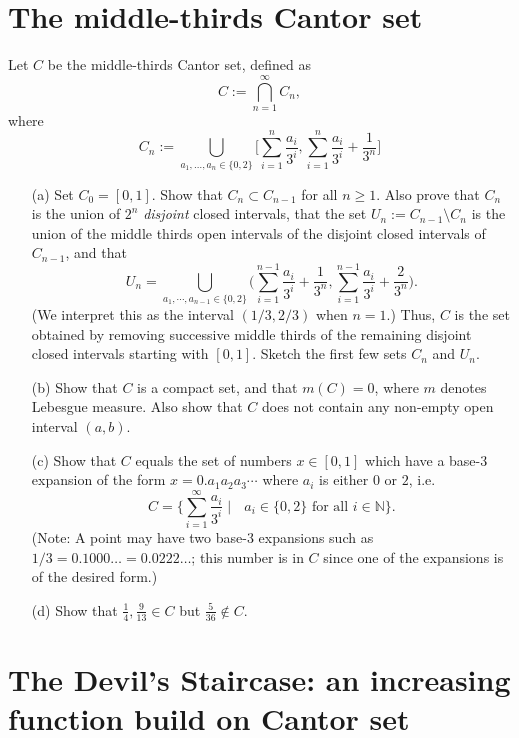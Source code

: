 \documentclass[lang=cn,11pt]{elegantbook}
\begin{document}
\section{The middle-thirds Cantor set}
  Let $C$ be the middle-thirds Cantor set, defined as
  \[
    C:=\bigcap_{n=1}^\infty C_n,
  \]
 where
\[
  C_n:=\bigcup_{a_1, \dots, a_n\in \{0,2\}} \big[\sum_{i=1}^n \frac{a_i}{3^i}, \sum_{i=1}^{n} \frac{a_i}{3^i} +\frac{1}{3^n} \big]
\]
\begin{itemize}
\item[(a)]
  Set $C_0=[0,1]$. Show that $C_n\subset C_{n-1}$ for all $n\ge1$.
  Also prove that $C_n$ is the union of $2^n$ \emph{disjoint} closed intervals, that the set  $U_n:=C_{n-1}\setminus C_n$ is the union of the middle thirds open intervals of the disjoint closed intervals of $C_{n-1}$, and that
\[
  U_n=\bigcup_{a_1, \cdots, a_{n-1}\in \{0,2\}} \big( \sum_{i=1}^{n-1} \frac{a_i}{3^i} + \frac{1}{3^n}, \sum_{i=1}^{n-1} \frac{a_i}{3^i} +\frac{2}{3^n} \big).
\]
(We interpret this as the interval $(1/3,2/3)$ when $n=1$.)
  Thus, $C$ is the set obtained by removing successive middle thirds of the remaining disjoint closed intervals starting with $[0,1]$. Sketch the first few sets $C_n$ and $U_n$.
\item[(b)]
  Show that $C$ is a compact set, and that $m(C)=0$, where $m$ denotes Lebesgue measure. Also show that $C$ does not contain any non-empty open interval $(a,b)$. 
\item[(c)]
  Show that $C$ equals the set of numbers $x\in [0,1]$ which have a base-3 expansion of the form
  $x=0.a_1a_2a_3\cdots$ where $a_i$ is either $0$ or $2$, i.e.\
  \[
    C=\{ \sum_{i=1}^\infty \frac{a_i}{3^i} \mid \text{ $a_i\in \{0,2\}$ for all $i\in \mathbb{N}$} \}.
  \]
  (Note: A point may have two base-3 expansions such as $1/3=0.1000\ldots=0.0222\ldots$; this number is in $C$ since one of the expansions is of the desired form.) 
\item[(d)]
  Show that $\frac14, \frac9{13}\in C$ but $\frac{5}{36}\notin C$.
\end{itemize}

\section{The Devil's Staircase: an increasing function build on Cantor set}
\end{document}

